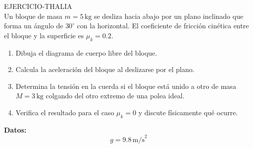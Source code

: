 

  
 \begin{multicols}{2}
    \begin{excercise}[][][]{}{
           EJERCICIO-THALIA\\
            Un bloque de masa $m = 5\,\text{kg}$ se desliza hacia abajo por un plano inclinado que forma un ángulo de $30^\circ$ con la horizontal.  
            El coeficiente de fricción cinética entre el bloque y la superficie es $\mu_k = 0.2$.
            \begin{enumerate}
                \item Dibuja el diagrama de cuerpo libre del bloque.
                \item Calcula la aceleración del bloque al deslizarse por el plano.
                \item Determina la tensión en la cuerda si el bloque está unido a otro de masa $M = 3\,\text{kg}$ colgando del otro extremo de una polea ideal.
                \item Verifica el resultado para el caso $\mu_k = 0$ y discute físicamente qué ocurre.
            \end{enumerate}
            \textbf{Datos:}
            \[
            g = 9.8\,\text{m/s}^2
            \]
        }
    \end{excercise}
 \end{multicols}
